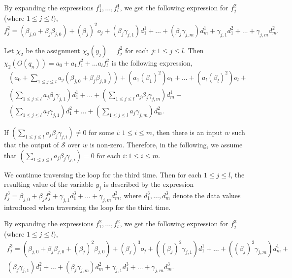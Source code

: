 \documentclass[11pt]{article}
\def\Ss{{\mathcal{S} }}
\begin{document}
By expanding the expressions $f^1_1,\dots, f^1_l$, we get the following expression for $f^2_{j}$ (where $1 \le j \le l$),
\[
f^2_{j} = (\beta_{j,0} + \beta_{j} \beta_{j,0}) + (\beta_{j})^2 o_{j} +
(\beta_{j}\gamma_{j,1}) d^1_1 +\dots + (\beta_{j}\gamma_{j,m}) d^1_m  + 
\gamma_{j,1} d^2_1 + \dots + \gamma_{j,m} d^2_m.
\]

Let $\chi_2$ be the assignment $\chi_2(y_j)=f^2_j$ for each $j: 1\le j \le l$.
Then $\chi_2(O(q_n)) = a_0+ a_1 f^2_1 + \dots a_l f^2_l$ is the following expression,
\[
\begin{array}{l}
(a_0 + \sum \limits_{1 \le j \le l} a_j (\beta_{j,0} + \beta_{j} \beta_{j,0})) +  (a_1 (\beta_1)^2) o_1 + \dots + (a_l (\beta_l)^2) o_l + \\
 (\sum \limits_{1 \le j \le l} a_j \beta_{j}\gamma_{j,1}) d^1_1 + \dots + (\sum \limits_{1 \le j \le l} a_j \beta_{j}\gamma_{j,m}) d^1_m + \\
(\sum \limits_{1 \le j \le l} a_j \gamma_{j,1}) d^2_1 + \dots + (\sum \limits_{1 \le j \le l} a_j \gamma_{j,m}) d^2_m.
\end{array}
\]

If $(\sum \limits_{1 \le j \le l} a_j \beta_j\gamma_{j,i}) \neq 0$ for some $i: 1 \le i \le m$, then there is an input $w$ such that the output of $\Ss$ over $w$ is non-zero. Therefore, in the following, we assume that $(\sum \limits_{1 \le j \le l} a_j \beta_j\gamma_{j,i}) = 0$ for each $i: 1 \le i \le m$.


We continue traversing the loop for the third time. Then for each $1 \le j \le l$,  the resulting value of the variable $y_{j}$ is described by the expression $f^3_{j} = \beta_{j,0} + \beta_{j} f^2_j  + \gamma_{j,1} d^3_1 + \dots + \gamma_{j,m} d^3_m$, where $d^3_1, \dots, d^3_m$ denote the data values introduced when traversing the loop for the third time. 

By expanding the expressions $f^2_1,\dots,f^2_l$, we get the following expression for $f^3_{j}$ (where $1\le j \le l$),
\[
\begin{array}{l}
f^3_{j} = (\beta_{j,0} + \beta_{j} \beta_{j,0} + (\beta_j)^2 \beta_{j,0}) + (\beta_{j})^3 o_{j} +
((\beta_{j})^2\gamma_{j,1}) d^1_1 +\dots + ((\beta_{j})^2\gamma_{j,m}) d^1_m  + \\
(\beta_j \gamma_{j,1}) d^2_1 + \dots + (\beta_j \gamma_{j,m}) d^2_m + \gamma_{j,1} d^3_1 + \dots + \gamma_{j,m} d^3_m.
\end{array}
\]
\end{document}
